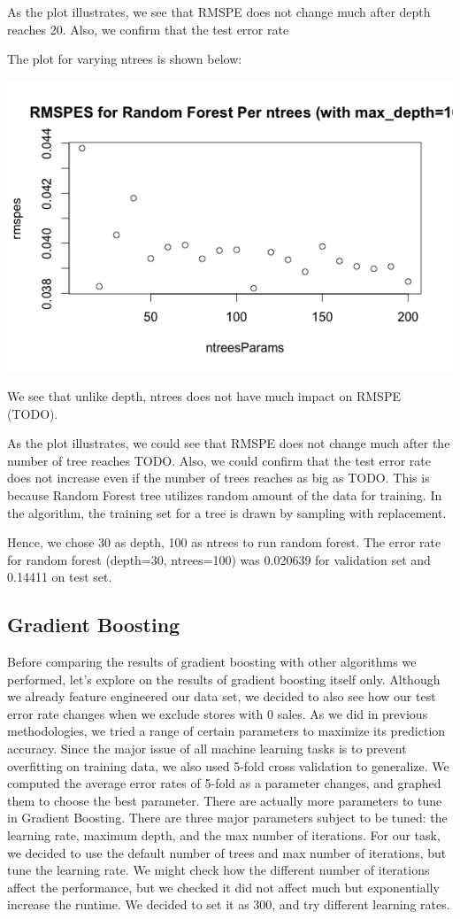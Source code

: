 \documentclass[letterpaper,twocolumn,10pt]{article}
\begin{document}
As the plot illustrates, we see that RMSPE does not change much after depth reaches 20. Also, we confirm that the test error rate 

The plot for varying ntrees is shown below:

\includegraphics[scale=0.35]{img/RandomForestPerNtrees.png}

We see that unlike depth, ntrees does not have much impact on RMSPE (TODO).

As the plot illustrates, we could see that RMSPE does not change much after the number of tree reaches TODO. Also, we could confirm that the test error rate does not increase even if the number of trees reaches as big as TODO. This is because Random Forest tree utilizes random amount of the data for training. In the algorithm, the training set for a tree is drawn by sampling with replacement.

Hence, we chose 30 as depth, 100 as ntrees to run random forest. The error rate for random forest (depth=30, ntrees=100) was 0.020639 for validation set and 0.14411 on test set.

\subsection{Gradient Boosting}
Before comparing the results of gradient boosting with other algorithms we performed, let's explore on the results of gradient boosting itself only. Although we already feature engineered our data set, we decided to also see how our test error rate changes when we exclude stores with 0 sales. As we did in previous methodologies, we tried a range of certain parameters to maximize its prediction accuracy. Since the major issue of all machine learning tasks is to prevent overfitting on training data, we also used 5-fold cross validation to generalize. We computed the average error rates of 5-fold as a parameter changes, and graphed them to choose the best parameter. There are actually more parameters to tune in Gradient Boosting. There are three major parameters subject to be tuned: the learning rate, maximum depth, and the max number of iterations. For our task, we decided to use the default number of trees and max number of iterations, but tune the learning rate. We might check how the different number of iterations affect the performance, but we checked it did not affect much but exponentially increase the runtime. We decided to set it as 300, and try different learning rates. 
\end{document}
